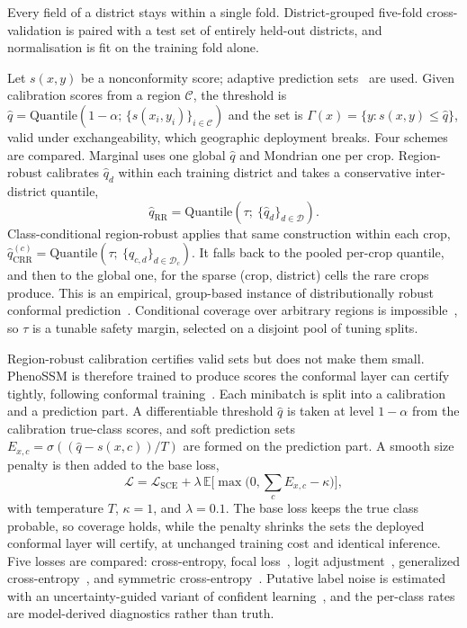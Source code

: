 \documentclass[conference]{IEEEtran}
\begin{document}
Every field of a district stays within a single fold. District-grouped five-fold
cross-validation is paired with a test set of entirely held-out districts, and
normalisation is fit on the training fold alone.

Let $s(x,y)$ be a nonconformity score; adaptive prediction sets~\cite{romano2020aps}
are used. Given calibration scores from a region $\mathcal{C}$, the threshold is
$\hat q = \mathrm{Quantile}(1-\alpha;\,\{s(x_i,y_i)\}_{i\in\mathcal{C}})$ and the set
is $\Gamma(x)=\{y:s(x,y)\le\hat q\}$, valid under exchangeability, which geographic
deployment breaks. Four schemes are compared. Marginal uses one global $\hat q$ and
Mondrian one per crop. Region-robust calibrates $\hat q_d$ within each training
district and takes a conservative inter-district quantile,
\begin{equation}
\hat q_{\mathrm{RR}} = \mathrm{Quantile}\!\left(\tau;\ \{\hat q_d\}_{d\in\mathcal{D}}\right).
\end{equation}
Class-conditional region-robust applies that same construction within each crop,
$\hat q^{(c)}_{\mathrm{CRR}} = \mathrm{Quantile}(\tau;\ \{\hat q_{c,d}\}_{d\in\mathcal{D}_c})$.
It falls back to the pooled per-crop quantile, and then to the global one, for the
sparse (crop, district) cells the rare crops produce. This is an empirical,
group-based instance of distributionally robust conformal
prediction~\cite{cauchois2024robust}. Conditional coverage over arbitrary regions is
impossible~\cite{barber2023nonexchangeable}, so $\tau$ is a tunable safety margin,
selected on a disjoint pool of tuning splits.

Region-robust calibration certifies valid sets but does not make them small.
PhenoSSM is therefore trained to produce scores the conformal layer can certify
tightly, following conformal training~\cite{stutz2022conformal}. Each minibatch is
split into a calibration and a prediction part. A differentiable threshold $\hat q$
is taken at level $1-\alpha$ from the calibration true-class scores, and soft
prediction sets $E_{x,c}=\sigma((\hat q - s(x,c))/T)$ are formed on the prediction
part. A smooth size penalty is then added to the base loss,
\begin{equation}
\mathcal{L} = \mathcal{L}_{\mathrm{SCE}} + \lambda\,\mathbb{E}\Big[\max\big(0,\textstyle\sum_c E_{x,c}-\kappa\big)\Big],
\end{equation}
with temperature $T$, $\kappa{=}1$, and $\lambda{=}0.1$. The base loss keeps the true
class probable, so coverage holds, while the penalty shrinks the sets the deployed
conformal layer will certify, at unchanged training cost and identical inference.
Five losses are compared: cross-entropy, focal loss~\cite{lin2017focal}, logit
adjustment~\cite{menon2021logitadjust}, generalized cross-entropy~\cite{zhang2018gce},
and symmetric cross-entropy~\cite{wang2019sce}. Putative label noise is estimated with
an uncertainty-guided variant of confident learning~\cite{northcutt2021confident}, and
the per-class rates are model-derived diagnostics rather than truth.
\end{document}

